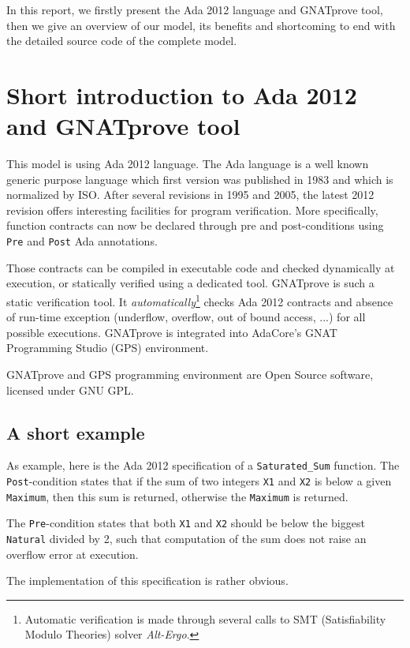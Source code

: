 \documentclass{template/openetcs_report}
\newcommand{\Ada}[1]{\lstinline[language=Ada,basicstyle={\sffamily},framesep=0pt]{#1}}
\begin{document}
In this report, we firstly present the Ada 2012 language and GNATprove
tool, then we give an overview of our model, its benefits and
shortcoming to end with the detailed source code of the complete
model.

\chapter{Short introduction to Ada 2012 and GNATprove tool}

This model is using Ada 2012 language\cite{arm2012}. The Ada language
is a well known generic purpose language which first version was
published in 1983 and which is normalized by ISO. After several
revisions in 1995 and 2005, the latest 2012 revision offers
interesting facilities for program verification. More specifically,
function contracts can now be declared through pre and post-conditions
using \Ada{Pre} and \Ada{Post} Ada annotations.

Those contracts can be compiled in executable code and checked
dynamically at execution, or statically verified using a dedicated
tool. GNATprove is such a static verification tool. It
\emph{automatically}\footnote{Automatic verification is made through
  several calls to SMT (Satisfiability Modulo Theories) solver
  \emph{Alt-Ergo}.} checks Ada 2012 contracts and absence of run-time
exception (underflow, overflow, out of bound access, ...) for all
possible executions. GNATprove is integrated into AdaCore's GNAT
Programming Studio (GPS) environment.

GNATprove and GPS programming environment are Open Source software,
licensed under GNU GPL.

\section{A short example}

As example, here is the Ada 2012 specification of a
\Ada{Saturated_Sum} function. The \Ada{Post}-condition states that if
the sum of two integers \Ada{X1} and \Ada{X2} is below a given
\Ada{Maximum}, then this sum is returned, otherwise the \Ada{Maximum}
is returned.

The \Ada{Pre}-condition states that both \Ada{X1} and \Ada{X2} should
be below the biggest \Ada{Natural} divided by 2, such that computation
of the sum does not raise an overflow error at execution.



The implementation of this specification is rather obvious.
\end{document}
